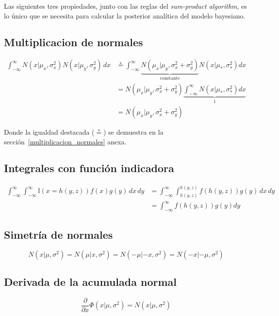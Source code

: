\documentclass[article]{jss}
\begin{document}
\begin{appendix}
Las siguientes tres propiedades, junto con las reglas del \emph{sum-product algorithm}, es lo \'unico que se necesita para calcular la posterior anal\'itica del modelo bayesiano.

\subsection*{Multiplicacion de normales}
\begin{equation}\label{eq:multiplicacion_normales}
\begin{split}
 \int_{-\infty}^{\infty} N(x|\mu_x,\sigma_x^2)N(x|\mu_y,\sigma_y^2) \, dx  &  \overset{*}{=} \int_{-\infty}^{\infty}  \underbrace{N(\mu_x|\mu_y,\sigma_x^2+\sigma_y^2)}_{\text{constante}} N(x|\mu_{*},\sigma_{*}^2) dx \\
 & = N(\mu_x|\mu_y,\sigma_x^2+\sigma_y^2) \underbrace{\int_{-\infty}^{\infty}  N(x|\mu_{*},\sigma_{*}^2) dx}_{1} \\
 & = N(\mu_x|\mu_y,\sigma_x^2+\sigma_y^2)
\end{split}
\end{equation}

Donde la igualdad destacada ($\overset{*}{=}$) se demuestra en la secci\'on~\ref{multiplicacion_normales} anexa.

\subsection*{Integrales con funci\'on indicadora}
\begin{equation}\label{eq:integral_con_indicadora}
\begin{split}
 \int_{-\infty}^{\infty}  \int_{-\infty}^{\infty}  \mathbb{I}(x=h(y,z)) f(x) g(y)\, dx\, dy &=  \int_{-\infty}^{\infty} \int_{h(y,z)}^{h(y,z)} f(h(y,z)) g(y)\, dx\, dy\\
 & = \int_{-\infty}^{\infty} f(h(y,z)) g(y) dy
\end{split}
\end{equation}

\subsection*{Simetr\'ia de normales}
\begin{equation}\label{eq:simetria}
 N(x|\mu,\sigma^2) = N(\mu|x,\sigma^2) = N(-\mu|-x,\sigma^2) = N(-x|-\mu,\sigma^2)
\end{equation}

\subsection*{Derivada de la acumulada normal}
\begin{equation}\label{eq:phi_norm}
 \frac{\partial}{\partial x} \Phi(x|\mu,\sigma^2) = N(x|\mu,\sigma^2)
\end{equation}


\end{appendix}
\end{document}
